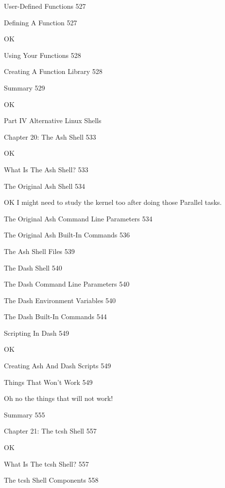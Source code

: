 User-Defined Functions 527



Defining A Function 527

OK

Using Your Functions 528



Creating A Function Library 528



Summary 529

OK

Part IV Alternative Linux Shells



Chapter 20: The Ash Shell 533

OK

What Is The Ash Shell? 533



The Original Ash Shell 534

OK I might need to study the kernel too after doing those Parallel tasks.

The Original Ash Command Line Parameters 534



The Original Ash Built-In Commands 536



The Ash Shell Files 539



The Dash Shell 540



The Dash Command Line Parameters 540



The Dash Environment Variables 540



The Dash Built-In Commands 544



Scripting In Dash 549

OK

Creating Ash And Dash Scripts 549



Things That Won't Work 549

Oh no the things that will not work!

Summary 555



Chapter 21: The tcsh Shell 557

OK

What Is The tcsh Shell? 557



The tcsh Shell Components 558



